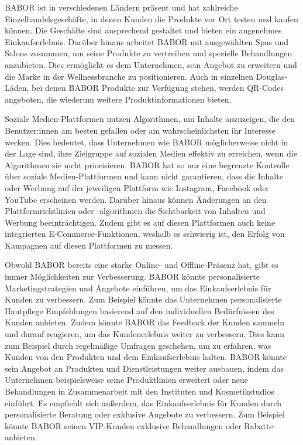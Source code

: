 BABOR ist in verschiedenen Ländern präsent und hat zahlreiche Einzelhandelsgeschäfte, in denen Kunden die Produkte vor Ort testen und kaufen können. Die Geschäfte sind ansprechend gestaltet und bieten ein angenehmes Einkaufserlebnis. Darüber hinaus arbeitet BABOR mit ausgewählten Spas und Salons zusammen, um seine Produkte zu vertreiben und spezielle Behandlungen anzubieten. Dies ermöglicht es dem Unternehmen, sein Angebot zu erweitern und die Marke in der Wellnessbranche zu positionieren. Auch in einzelnen Douglas-Läden, bei denen BABOR Produkte zur Verfügung stehen, werden QR-Codes angeboten, die wiederum weitere Produktinformationen bieten.
\newline

Soziale Medien-Plattformen nutzen Algorithmen, um Inhalte anzuzeigen, die den Benutzer:innen am besten gefallen oder am wahrscheinlichsten ihr Interesse wecken. Dies bedeutet, dass Unternehmen wie BABOR möglicherweise nicht in der Lage sind, ihre Zielgruppe auf sozialen Medien effektiv zu erreichen, wenn die Algorithmen sie nicht priorisieren.
BABOR hat so nur eine begrenzte Kontrolle über soziale Medien-Plattformen und kann nicht garantieren, dass die Inhalte oder Werbung auf der jeweiligen Plattform wie Instagram, Facebook oder YouTube erscheinen werden. Darüber hinaus können Änderungen an den Plattformrichtlinien oder -algorithmen die Sichtbarkeit von Inhalten und Werbung beeinträchtigen. Zudem gibt es auf diesen Plattformen auch keine integrierten E-Commerce-Funktionen, weshalb es schwierig ist, den Erfolg von Kampagnen auf diesen Plattformen zu messen.
\newline

Obwohl BABOR bereits eine starke Online- und Offline-Präsenz hat, gibt es immer Möglichkeiten zur Verbesserung. BABOR könnte personalisierte Marketingstrategien und Angebote einführen, um das Einkaufserlebnis für Kunden zu verbessern. Zum Beispiel könnte das Unternehmen personalisierte Hautpflege Empfehlungen basierend auf den individuellen Bedürfnissen des Kunden anbieten.
Zudem könnte BABOR das Feedback der Kunden sammeln und darauf reagieren, um das Kundenerlebnis weiter zu verbessern. Dies kann zum Beispiel durch regelmäßige Umfragen geschehen, um zu erfahren, was Kunden von den Produkten und dem Einkaufserlebnis halten.
BABOR könnte sein Angebot an Produkten und Dienstleistungen weiter ausbauen, indem das Unternehmen beispielsweise seine Produktlinien erweitert oder neue Behandlungen in Zusammenarbeit mit den Instituten und Kosmetikstudios einführt.
Es empfiehlt sich außerdem,  das Einkaufserlebnis für Kunden durch personalisierte Beratung oder exklusive Angebote zu verbessern. Zum Beispiel könnte BABOR seinen VIP-Kunden exklusive Behandlungen oder Rabatte anbieten.
\newline


